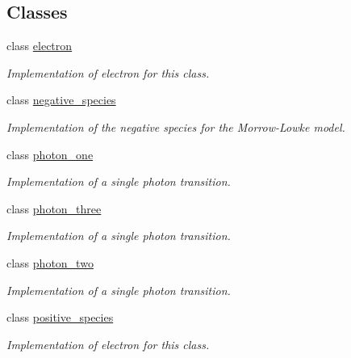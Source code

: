 \subsection*{Classes}
\begin{DoxyCompactItemize}
\item 
class \hyperlink{classmorrow__lowke_1_1electron}{electron}
\begin{DoxyCompactList}\small\item\em Implementation of electron for this class. \end{DoxyCompactList}\item 
class \hyperlink{classmorrow__lowke_1_1negative__species}{negative\+\_\+species}
\begin{DoxyCompactList}\small\item\em Implementation of the negative species for the Morrow-\/\+Lowke model. \end{DoxyCompactList}\item 
class \hyperlink{classmorrow__lowke_1_1photon__one}{photon\+\_\+one}
\begin{DoxyCompactList}\small\item\em Implementation of a single photon transition. \end{DoxyCompactList}\item 
class \hyperlink{classmorrow__lowke_1_1photon__three}{photon\+\_\+three}
\begin{DoxyCompactList}\small\item\em Implementation of a single photon transition. \end{DoxyCompactList}\item 
class \hyperlink{classmorrow__lowke_1_1photon__two}{photon\+\_\+two}
\begin{DoxyCompactList}\small\item\em Implementation of a single photon transition. \end{DoxyCompactList}\item 
class \hyperlink{classmorrow__lowke_1_1positive__species}{positive\+\_\+species}
\begin{DoxyCompactList}\small\item\em Implementation of electron for this class. \end{DoxyCompactList}\end{DoxyCompactItemize}
